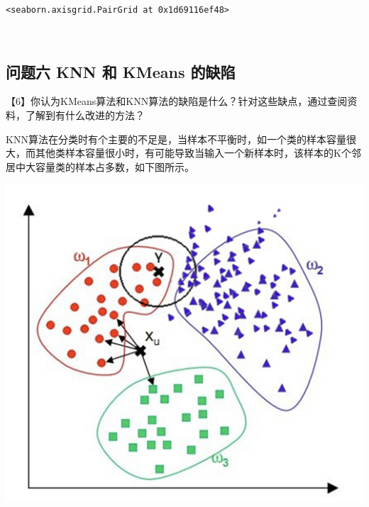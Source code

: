 \documentclass[11pt]{article}
\makeatletter
\newcommand{\boxspacing}{\kern\kvtcb@left@rule\kern\kvtcb@boxsep}
\newcommand{\prompt}[4]{
        \ttfamily\llap{{\color{#2}[#3]:\hspace{3pt}#4}}\vspace{-\baselineskip}
    }
\makeatother
\begin{document}
            \begin{tcolorbox}[breakable, size=fbox, boxrule=.5pt, pad at break*=1mm, opacityfill=0]
\prompt{Out}{outcolor}{58}{\boxspacing}
\begin{Verbatim}[commandchars=\\\{\}]
<seaborn.axisgrid.PairGrid at 0x1d69116ef48>
\end{Verbatim}
\end{tcolorbox}
        
    \begin{center}
    \end{center}
    { \hspace*{\fill} \\}
    
    \hypertarget{ux95eeux9898ux516d-knn-ux548c-kmeans-ux7684ux7f3aux9677}{%
\subsection{问题六 KNN 和 KMeans
的缺陷}\label{ux95eeux9898ux516d-knn-ux548c-kmeans-ux7684ux7f3aux9677}}

    【6】你认为KMeans算法和KNN算法的缺陷是什么？针对这些缺点，通过查阅资料，了解到有什么改进的方法？

    KNN算法在分类时有个主要的不足是，当样本不平衡时，如一个类的样本容量很大，而其他类样本容量很小时，有可能导致当输入一个新样本时，该样本的K个邻居中大容量类的样本占多数，如下图所示。
    
    \includegraphics{06.png}
    
\end{document}
